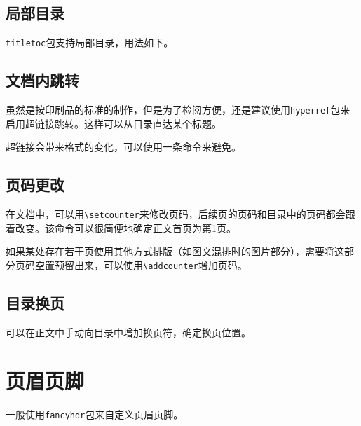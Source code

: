 \documentclass[10pt,openany]{book}
\begin{document}


\section{局部目录}

\texttt{titletoc}包支持局部目录，用法如下。



\section{文档内跳转}

虽然是按印刷品的标准的制作，但是为了检阅方便，还是建议使用\texttt{hyperref}包来启用超链接跳转。这样可以从目录直达某个标题。

超链接会带来格式的变化，可以使用一条命令来避免。



\section{页码更改}

在文档中，可以用\texttt{\textbackslash{}setcounter}来修改页码，后续页的页码和目录中的页码都会跟着改变。该命令可以很简便地确定正文首页为第1页。



如果某处存在若干页使用其他方式排版（如图文混排时的图片部分），需要将这部分页码空置预留出来，可以使用\texttt{\textbackslash{}addcounter}增加页码。



\section{目录换页}

可以在正文中手动向目录中增加换页符，确定换页位置。



\chapter{页眉页脚}

一般使用\texttt{fancyhdr}包来自定义页眉页脚。
\end{document}
